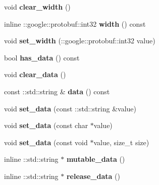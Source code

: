 \begin{DoxyCompactItemize}
void {\bfseries clear\+\_\+width} ()
\item 
\mbox{\label{classcaffe_1_1_datum_afbf4d034957416f3f8506becf9b9976e}} 
inline \+::google\+::protobuf\+::int32 {\bfseries width} () const
\item 
\mbox{\label{classcaffe_1_1_datum_af3e1c1e736e20b961e39f698f82ee840}} 
void {\bfseries set\+\_\+width} (\+::google\+::protobuf\+::int32 value)
\item 
\mbox{\label{classcaffe_1_1_datum_a300124e89cabba6af94b86dbe0db304c}} 
bool {\bfseries has\+\_\+data} () const
\item 
\mbox{\label{classcaffe_1_1_datum_ae08f58a051fa2bcf7d002c8bbec3d993}} 
void {\bfseries clear\+\_\+data} ()
\item 
\mbox{\label{classcaffe_1_1_datum_a6f3f196de4e5340754b02802d5de0808}} 
const \+::std\+::string \& {\bfseries data} () const
\item 
\mbox{\label{classcaffe_1_1_datum_a552eb07ebf6502b7b6ab5ccb3a1a0449}} 
void {\bfseries set\+\_\+data} (const \+::std\+::string \&value)
\item 
\mbox{\label{classcaffe_1_1_datum_a8186e25515b68160abc98584cc2a722d}} 
void {\bfseries set\+\_\+data} (const char $\ast$value)
\item 
\mbox{\label{classcaffe_1_1_datum_a8d04604fbd13a265580d28b742e384b3}} 
void {\bfseries set\+\_\+data} (const void $\ast$value, size\+\_\+t size)
\item 
\mbox{\label{classcaffe_1_1_datum_a156d248d8454092db146a0ee68167fe6}} 
inline \+::std\+::string $\ast$ {\bfseries mutable\+\_\+data} ()
\item 
\mbox{\label{classcaffe_1_1_datum_ac9945dd02c2f6c96924be435a056bdfb}} 
inline \+::std\+::string $\ast$ {\bfseries release\+\_\+data} ()
\item 
\mbox{\label{classcaffe_1_1_datum_ad0da0841a54b5cde90b76c2dee977df5}} 

\end{DoxyCompactItemize}
